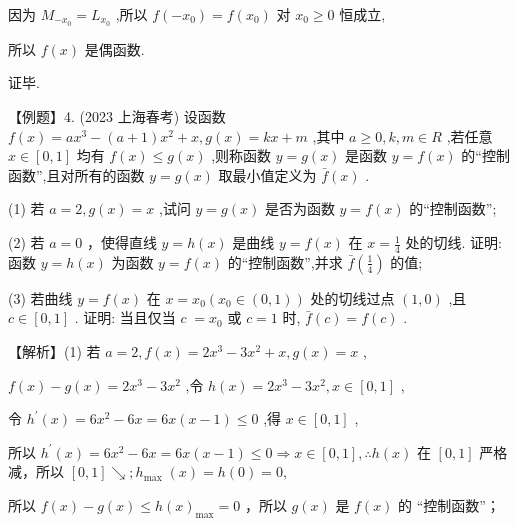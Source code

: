 \documentclass[10pt]{article}
\begin{document}
因为 \({M}_{-{x}_{0}} = {L}_{{x}_{0}}\) ,所以 \(f\left( {-{x}_{0}}\right)  = f\left( {x}_{0}\right)\) 对 \({x}_{0} \geq  0\) 恒成立,

所以 \(f\left( x\right)\) 是偶函数.

证毕.

【例题】4. (2023 上海春考) 设函数 \(f\left( x\right)  = a{x}^{3} - \left( {a + 1}\right) {x}^{2} + x,g\left( x\right)  = {kx} + m\) ,其中 \(a \geq  0,k,m \in  R\) ,若任意 \(x \in  \left\lbrack  {0,1}\right\rbrack\) 均有 \(f\left( x\right)  \leq  g\left( x\right)\) ,则称函数 \(y = g\left( x\right)\) 是函数 \(y = f\left( x\right)\) 的“控制函数”,且对所有的函数 \(y = g\left( x\right)\) 取最小值定义为 \(\bar{f}\left( x\right)\) .

(1) 若 \(a = 2,g\left( x\right)  = x\) ,试问 \(y = g\left( x\right)\) 是否为函数 \(y = f\left( x\right)\) 的“控制函数”;

(2) 若 \(a = 0\) ，使得直线 \(y = h\left( x\right)\) 是曲线 \(y = f\left( x\right)\) 在 \(x = \frac{1}{4}\) 处的切线. 证明:函数 \(y = h\left( x\right)\) 为函数 \(y = f\left( x\right)\) 的“控制函数”,并求 \(\bar{f}\left( \frac{1}{4}\right)\) 的值;

(3) 若曲线 \(y = f\left( x\right)\) 在 \(x = {x}_{0}\left( {{x}_{0} \in  \left( {0,1}\right) }\right)\) 处的切线过点 \(\left( {1,0}\right)\) ,且 \(c \in  \left\lbrack  {0,1}\right\rbrack\) . 证明: 当且仅当 \(c \; = {x}_{0}\) 或 \(c = 1\) 时, \(\bar{f}\left( c\right)  = f\left( c\right)\) .

【解析】(1) 若 \(a = 2,f\left( x\right)  = 2{x}^{3} - 3{x}^{2} + x,g\left( x\right)  = x\) ,

\(f\left( x\right)  - g\left( x\right)  = 2{x}^{3} - 3{x}^{2}\) ,令 \(h\left( x\right)  = 2{x}^{3} - 3{x}^{2},x \in  \left\lbrack  {0,1}\right\rbrack\) ,

令 \({h}^{\prime }\left( x\right)  = 6{x}^{2} - {6x} = {6x}\left( {x - 1}\right)  \leq  0\) ,得 \(x \in  \left\lbrack  {0,1}\right\rbrack\) ,

所以 \({h}^{\prime }\left( x\right)  = 6{x}^{2} - {6x} = {6x}\left( {x - 1}\right)  \leq  0 \Rightarrow  x \in  \left\lbrack  {0,1}\right\rbrack  ,\therefore h\left( x\right)\) 在 \(\left\lbrack  {0,1}\right\rbrack\) 严格减，所以 \(\left\lbrack  {0,1}\right\rbrack   \searrow  ;{h}_{\max } \; \left( x\right)  = h\left( 0\right)  = 0,\)

所以 \(f\left( x\right)  - g\left( x\right)  \leq  h{\left( x\right) }_{\max } = 0\) ，所以 \(g\left( x\right)\) 是 \(f\left( x\right)\) 的 “控制函数”；
\end{document}

